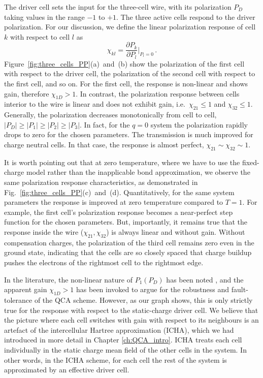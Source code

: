 The driver cell sets the input for the three-cell wire, with its
polarization $P_D$ taking values in the range $-1$ to $+1$. The three active
cells respond to the driver polarization. For our discussion, we define the
linear polarization response of cell $k$ with respect to cell $l$ as
%
\begin{equation}
  \label{eq:polarization_response}
  \chi_{kl} = \frac{\partial P_k}{\partial P_l}\big|_{P_l = 0} \, .
\end{equation}
%
Figure~\ref{fig:three_cells_PP}(a)~and~(b) show the polarization of the first cell
with respect to the driver cell, the polarization of the second cell with
respect to the first cell, and so on. For the first cell, the response is
non-linear and shows gain, therefore $\chi_{1D} > 1$. In contrast, the
polarization response between cells interior to the wire is linear and does not
exhibit gain, i.e.\ $\chi_{21} \le 1$ and $\chi_{32} \le 1$. Generally, the
polarization decreases monotonically from cell to cell, $|P_D| \ge |P_1| \ge
|P_2| \ge |P_3|$. In fact, for the $q=0$ system the polarization rapidly drops
to zero for the chosen parameters. The transmission is much improved for charge
neutral cells. In that case, the response is almost perfect, $\chi_{21} \sim
\chi_{32} \sim 1$.

It is worth pointing out that at zero temperature, where we have to use the
fixed-charge model rather than the inapplicable bond approximation, we observe
the same polarization response characteristics, as demonstrated in
Fig.~\ref{fig:three_cells_PP}(c)~and~(d). Quantitatively, for the same system
parameters the response is improved at zero temperature compared to $T=1$. For
example, the first cell's polarization response becomes a near-perfect step
function for the chosen parameters. But, importantly, it remains true that the
response inside the wire ($\chi_{21}, \chi_{32}$) is always linear and without
gain. Without compensation charges, the polarization of the third cell remains
zero even in the ground state, indicating that the cells are so closely spaced
that charge buildup pushes the electrons of the rightmost cell to the rightmost
edge.

In the literature, the non-linear nature of $P_1(P_D)$ has been noted
\cite{lent1993quantum} \cite{lent1993lines}, and the apparent gain $\chi_{1D} >
1$ has been invoked to argue for the robustness and fault-tolerance of the QCA
scheme. However, as our graph shows, this is only strictly true for the response
with respect to the static-charge driver cell. We believe that the picture where each cell
switches with gain with respect to its neighbours is an artefact of the
intercellular Hartree approximation (ICHA), which we had introduced in more
detail in Chapter \ref{ch:QCA_intro}. ICHA treats each cell individually in the
static charge mean field of the other cells in the system. In other words, in
the ICHA scheme, for each cell the rest of the system is approximated by an
effective driver cell.

